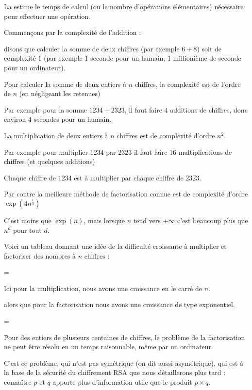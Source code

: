 La  estime le temps de calcul (ou le nombre d'opérations élémentaires)
nécessaire pour effectuer une opération.

\change
Commençons par la complexité de l'addition :

\change
disons que calculer la somme de deux chiffres (par exemple $6+8$) soit de complexité $1$
(par exemple $1$ seconde pour un humain, $1$ millionième de seconde pour un ordinateur).

\change
Pour calculer la somme de deux entiers à $n$ chiffres, la complexité est de l'ordre de $n$ (en négligeant les retenues)

\change
Par exemple pour la somme $1234+2323$, il faut faire $4$ additions de chiffres, 
donc environ $4$ secondes pour un humain.

\change

\change
La multiplication de deux entiers à $n$ chiffres est de complexité d'ordre $n^2$. 

\change
Par exemple pour multiplier $1234$ par $2323$ il faut faire
$16$ multiplications de chiffres (et quelques additions)

Chaque chiffre de $1234$ est à multiplier par chaque chiffre
de $2323$.

\change
Par contre la meilleure méthode de factorisation connue est de complexité d'ordre
$\exp(4n^\frac13)$ 

C'est moins que $\exp(n)$, mais lorsque $n$ tend vers $+\infty$ c'est beaucoup plus que $n^d$ pour tout $d$.


\diapo

Voici un tableau donnant une idée de la difficulté croissante à multiplier et factoriser des nombres à $n$ chiffres :

=

Ici pour la multiplication, nous avons une croissance en le carré de $n$.

alors que pour la factorisation nous avons une croissance de type exponentiel.

=

Pour des entiers de plusieurs centaines de chiffres, le problème de la factorisation ne peut être résolu 
en un temps raisonnable, même par un ordinateur.

C'est ce problème, qui n'est pas symétrique (on dit aussi asymétrique), qui est à la base de la sécurité du chiffrement RSA que nous détaillerons plus tard : connaître $p$ et $q$ apporte plus d'information utile que le produit $p\times q$. 

